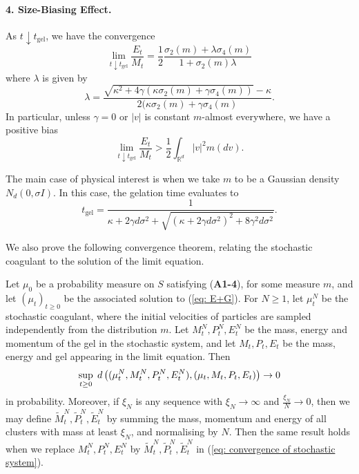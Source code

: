 \begin{theorem}
\paragraph{4. Size-Biasing Effect.} As $t\downarrow t_\text{gel}$, we have the convergence \begin{equation}
    \lim_{t\downarrow t_\text{gel}}\frac{E_t}{M_t}=\frac{1}{2}\frac{\sigma_2(m)+\lambda\sigma_4(m)}{1+\sigma_2(m)\lambda}
\end{equation} where $\lambda$ is given by \begin{equation} \lambda=\frac{\sqrt{\kappa^2+4\gamma(\kappa\sigma_2(m)+\gamma \sigma_4(m))}-\kappa}{2(\kappa\sigma_2(m)+\gamma\sigma_4(m)}.\end{equation} In particular, unless $\gamma=0$ or $|v|$ is constant $m$-almost everywhere, we have a positive bias \begin{equation}
    \lim_{t\downarrow t_\text{gel}}\frac{E_t}{M_t}>\frac{1}{2}\int_{\mathbb{R}^d}|v|^2m(dv).
\end{equation}

The main case of physical interest is when we take $m$ to be a Gaussian density $N_d(0, \sigma I)$. In this case, the gelation time evaluates to
\begin{equation}
    \label{eq: formula of tgel} t_\text{gel} = \frac{1}{\kappa+2\gamma d \sigma^2+
    \sqrt{(\kappa+2\gamma d \sigma^2)^2+8\gamma^2 d \sigma^2}}.
\end{equation} \end{theorem}
We also prove the following convergence theorem, relating the stochastic coagulant to the solution of the limit equation.  
\begin{theorem} \label{thrm: convergence of stochastic coagulent} Let $\mu_0$ be a probability measure on $S$ satisfying (\textbf{A1-4}), for some measure $m$, and let $(\mu_t)_{t\ge 0}$ be the associated solution to (\ref{eq: E+G}). For $N\ge 1$, let $\mu^N_t$ be the stochastic coagulant, where the initial velocities of particles are sampled independently from the distribution $m$. Let $M^N_t, P^N_t, E^N_t$ be the mass, energy and momentum of the gel in the stochastic system, and let $M_t, P_t, E_t$ be the mass, energy and gel appearing in the limit equation. Then \begin{equation} \label{eq: convergence of stochastic system}
    \sup_{t\ge 0}\hspace{0.1cm}d\left((\mu^N_t, M^N_t, P^N_t, E^N_t),(\mu_t, M_t, P_t, E_t)\right) \rightarrow 0
\end{equation} in probability. Moreover, if $\xi_N$ is any sequence with $\xi_N\rightarrow \infty$ and $\frac{\xi_N}{N}\rightarrow 0$, then we may define $\widetilde{M}^N_t, \widetilde{P}^N_t, \widetilde{E}^N_t$ by summing the mass, momentum and energy of all clusters with mass at least $\xi_N$, and normalising by $N$. Then the same result holds when we replace $M^N_t, P^N_t, E^N_t$ by $\widetilde{M}^N_t, \widetilde{P}^N_t, \widetilde{E}^N_t$ in (\ref{eq: convergence of stochastic system}).
\end{theorem}